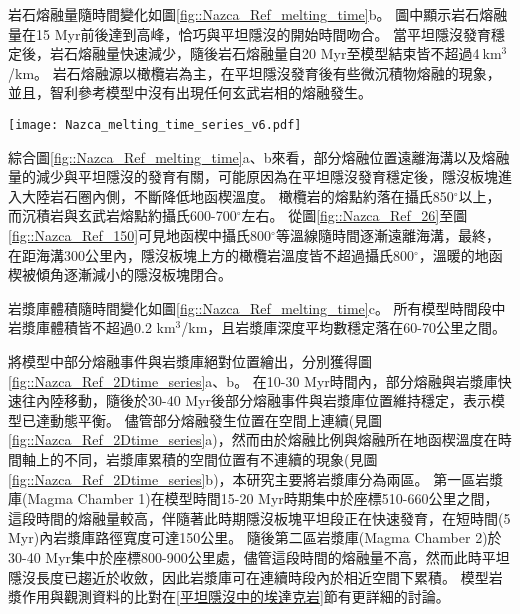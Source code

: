岩石熔融量隨時間變化如圖\ref{fig::Nazca_Ref_melting_time}b。
圖中顯示岩石熔融量在15 Myr前後達到高峰，恰巧與平坦隱沒的開始時間吻合。
當平坦隱沒發育穩定後，岩石熔融量快速減少，隨後岩石熔融量自20 Myr至模型結束皆不超過4$\ $km$^3$/km。
岩石熔融源以橄欖岩為主，在平坦隱沒發育後有些微沉積物熔融的現象，並且，智利參考模型中沒有出現任何玄武岩相的熔融發生。

\begin{figure*}[ht!]
    \centering
    \texttt{[image: Nazca\_melting\_time\_series\_v6.pdf]}
    \caption[智利參考模型岩漿作用隨時間變化]{智利參考模型岩漿作用隨時間變化，灰色底標出平坦隱沒發育後時間段。(a)部分熔融與海溝之距離隨時間變化圖，縱軸中每個點代表每次部分熔融發生位置，顏色為指數上的部分熔融比例。(b)岩石熔融量隨時間變化圖，熔融量單位為每20萬年瞬時每單位海溝之立方公里量。顏色代表不同岩相。(c)岩漿庫體積與深度隨時間變化圖，岩漿庫單位為每單位海溝之立方公里量。顏色代表該時間中岩漿庫的平均所在深度。}
    \label{fig::Nazca_Ref_melting_time}
\end{figure*}

綜合圖\ref{fig::Nazca_Ref_melting_time}a、b來看，部分熔融位置遠離海溝以及熔融量的減少與平坦隱沒的發育有關，可能原因為在平坦隱沒發育穩定後，隱沒板塊進入大陸岩石圈內側，不斷降低地函楔溫度。
橄欖岩的熔點約落在攝氏850$^{\circ}$以上，而沉積岩與玄武岩熔點約攝氏600-700$^{\circ}$左右。
從圖\ref{fig::Nazca_Ref_26}至圖\ref{fig::Nazca_Ref_150}可見地函楔中攝氏800$^{\circ}$等溫線隨時間逐漸遠離海溝，最終，在距海溝300公里內，隱沒板塊上方的橄欖岩溫度皆不超過攝氏800$^{\circ}$，溫暖的地函楔被傾角逐漸減小的隱沒板塊閉合。

岩漿庫體積隨時間變化如圖\ref{fig::Nazca_Ref_melting_time}c。
所有模型時間段中岩漿庫體積皆不超過0.2 km$^3$/km，且岩漿庫深度平均數穩定落在60-70公里之間。

將模型中部分熔融事件與岩漿庫絕對位置繪出，分別獲得圖\ref{fig::Nazca_Ref_2Dtime_series}a、b。
在10-30 Myr時間內，部分熔融與岩漿庫快速往內陸移動，隨後於30-40 Myr後部分熔融事件與岩漿庫位置維持穩定，表示模型已達動態平衡。
儘管部分熔融發生位置在空間上連續(見圖\ref{fig::Nazca_Ref_2Dtime_series}a)，然而由於熔融比例與熔融所在地函楔溫度在時間軸上的不同，岩漿庫累積的空間位置有不連續的現象(見圖\ref{fig::Nazca_Ref_2Dtime_series}b)，本研究主要將岩漿庫分為兩區。
第一區岩漿庫(Magma Chamber 1)在模型時間15-20 Myr時期集中於座標510-660公里之間，這段時間的熔融量較高，伴隨著此時期隱沒板塊平坦段正在快速發育，在短時間(5 Myr)內岩漿庫路徑寬度可達150公里。
隨後第二區岩漿庫(Magma Chamber 2)於30-40 Myr集中於座標800-900公里處，儘管這段時間的熔融量不高，然而此時平坦隱沒長度已趨近於收斂，因此岩漿庫可在連續時段內於相近空間下累積。
模型岩漿作用與觀測資料的比對在\ref{平坦隱沒中的埃達克岩}節有更詳細的討論。

